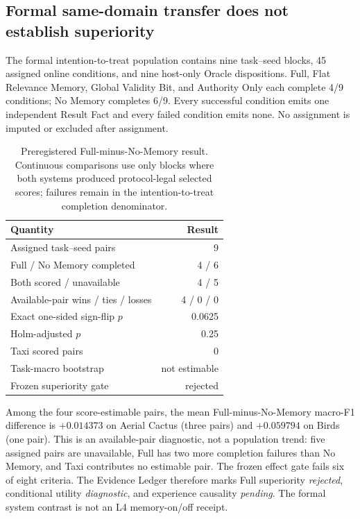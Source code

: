 \documentclass{article}
\begin{document}
\subsection{Formal same-domain transfer does not establish superiority}
\label{sec:formal-online}

The formal intention-to-treat population contains nine task--seed blocks, 45
assigned online conditions, and nine host-only Oracle dispositions.  Full,
Flat Relevance Memory, Global Validity Bit, and Authority Only each complete
4/9 conditions; No Memory completes 6/9.  Every successful condition emits one
independent Result Fact and every failed condition emits none.  No assignment is
imputed or excluded after assignment.

\begin{table}[t]
\caption{Preregistered Full-minus-No-Memory result.  Continuous comparisons use
only blocks where both systems produced protocol-legal selected scores; failures
remain in the intention-to-treat completion denominator.}
\label{tab:formal-online}
\centering
\small
\begin{tabular}{lr}
\toprule
Quantity & Result \\
\midrule
Assigned task--seed pairs & 9 \\
Full / No Memory completed & 4 / 6 \\
Both scored / unavailable & 4 / 5 \\
Available-pair wins / ties / losses & 4 / 0 / 0 \\
Exact one-sided sign-flip $p$ & 0.0625 \\
Holm-adjusted $p$ & 0.25 \\
Taxi scored pairs & 0 \\
Task-macro bootstrap & not estimable \\
Frozen superiority gate & rejected \\
\bottomrule
\end{tabular}
\end{table}

Among the four score-estimable pairs, the mean Full-minus-No-Memory macro-F1
difference is $+0.014373$ on Aerial Cactus (three pairs) and $+0.059794$ on
Birds (one pair).  This is an available-pair diagnostic, not a population trend:
five assigned pairs are unavailable, Full has two more completion failures than
No Memory, and Taxi contributes no estimable pair.  The frozen effect gate fails
six of eight criteria.  The Evidence Ledger therefore marks Full superiority
\emph{rejected}, conditional utility \emph{diagnostic}, and experience causality
\emph{pending}.  The formal system contrast is not an L4 memory-on/off receipt.
\end{document}
